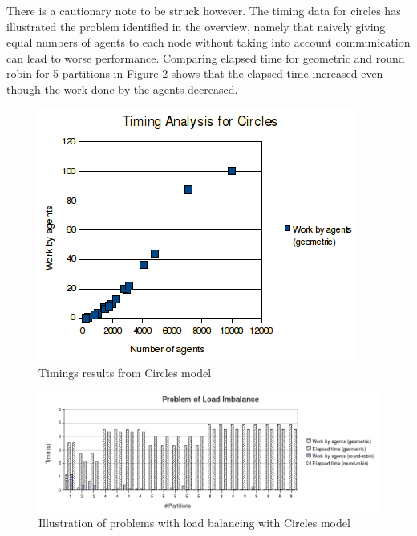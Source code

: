 There is a cautionary note to be struck however. The timing data for circles has illustrated the problem identified in the overview, namely that naively giving equal numbers of agents to each node without taking into account communication can lead to worse performance. Comparing elapsed time for geometric and round robin for 5 partitions in Figure \ref{fig:timings_problems} shows that the elapsed time increased even though the work done by the agents decreased.

\begin{figure}[h]
 \centering
  \includegraphics[scale=0.75]{circles-timings.png}
 \caption{Timings results from Circles model}
 \label{fig:circle_timings}
\end{figure}

\begin{figure}[h]
  \hspace{-10mm}
  \includegraphics[scale=0.6]{timings-problems.png}
 \caption{Illustration of problems with load balancing with Circles model}
 \label{fig:timings_problems}
\end{figure}

